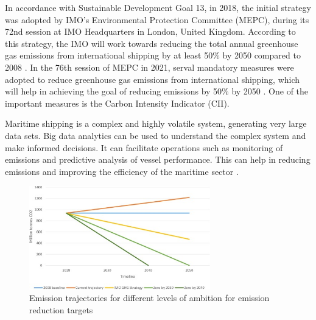 In accordance with Sustainable Development Goal 13, in 2018, the initial strategy was adopted by IMO's Environmental Protection Committee (MEPC),
during its 72nd session at IMO Headquarters in London, United Kingdom. According to this strategy,
the IMO will work towards reducing the total annual greenhouse gas emissions from international shipping by at least 50\% by 2050 compared to 2008 \autocite{imo-2018}.
In the 76th session of MEPC in 2021, serval mandatory measures were adopted to reduce greenhouse gas emissions from international shipping,
which will help in achieving the goal of reducing emissions by 50\% by 2050 \autocite{imo-2021}.
One of the important measures is the Carbon Intensity Indicator (CII).

Maritime shipping is a complex and highly volatile system, generating very large data sets.
Big data analytics can be used to understand the complex system and make informed decisions.
It can facilitate operations such as monitoring of emissions and predictive analysis of vessel performance.
This can help in reducing emissions and improving the efficiency of the maritime sector \autocite{ZAMAN2017537}.

\begin{figure}[ht]
    \centering
    \includegraphics[width=0.7\textwidth]{images/emission_trajactory.jpg}
    \caption{Emission trajectories for different levels of ambition for emission reduction targets}
    \label{emissionTrajectory}
\end{figure}








